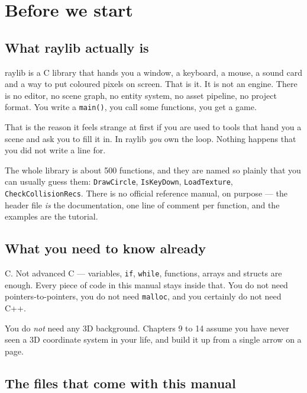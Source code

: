 \chapter{Before we start}

\section{What raylib actually is}

raylib is a C library that hands you a window, a keyboard, a mouse, a sound card
and a way to put coloured pixels on screen. That is it. It is not an engine.
There is no editor, no scene graph, no entity system, no asset pipeline, no
project format. You write a \lstinline|main()|, you call some functions, you get
a game.

That is the reason it feels strange at first if you are used to tools that hand
you a scene and ask you to fill it in. In raylib \emph{you} own the loop. Nothing
happens that you did not write a line for.

The whole library is about 500 functions, and they are named so plainly that you
can usually guess them: \lstinline|DrawCircle|, \lstinline|IsKeyDown|,
\lstinline|LoadTexture|, \lstinline|CheckCollisionRecs|. There is no official
reference manual, on purpose --- the header file  \emph{is} the
documentation, one line of comment per function, and the examples are the
tutorial.


\section{What you need to know already}

C. Not advanced C --- variables, \lstinline|if|, \lstinline|while|, functions,
arrays and structs are enough. Every piece of code in this manual stays inside
that. You do not need pointers-to-pointers, you do not need
\lstinline|malloc|, and you certainly do not need C++.

You do \emph{not} need any 3D background. Chapters 9 to 14 assume you have never
seen a 3D coordinate system in your life, and build it up from a single arrow on
a page.

\section{The files that come with this manual}

